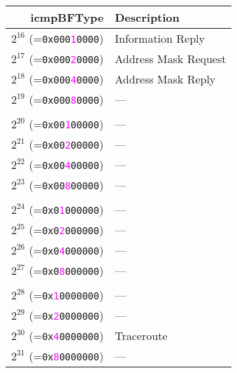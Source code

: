 \documentclass[documentation]{subfiles}
\begin{document}
\begin{minipage}{0.45\textwidth}
    \begin{longtable} {rl}
        \toprule
        {\bf icmpBFType} & {\bf Description} \\
        \midrule\endhead%
        $2^{16}$ (={\tt 0x000\textcolor{magenta}{1}0000}) & Information Reply \\
        $2^{17}$ (={\tt 0x000\textcolor{magenta}{2}0000}) & Address Mask Request \\
        $2^{18}$ (={\tt 0x000\textcolor{magenta}{4}0000}) & Address Mask Reply \\
        $2^{19}$ (={\tt 0x000\textcolor{magenta}{8}0000}) & --- \\
        \\
        $2^{20}$ (={\tt 0x00\textcolor{magenta}{1}00000}) & --- \\
        $2^{21}$ (={\tt 0x00\textcolor{magenta}{2}00000}) & --- \\
        $2^{22}$ (={\tt 0x00\textcolor{magenta}{4}00000}) & --- \\
        $2^{23}$ (={\tt 0x00\textcolor{magenta}{8}00000}) & --- \\
        \\
        $2^{24}$ (={\tt 0x0\textcolor{magenta}{1}000000}) & --- \\
        $2^{25}$ (={\tt 0x0\textcolor{magenta}{2}000000}) & --- \\
        $2^{26}$ (={\tt 0x0\textcolor{magenta}{4}000000}) & --- \\
        $2^{27}$ (={\tt 0x0\textcolor{magenta}{8}000000}) & --- \\
        \\
        $2^{28}$ (={\tt 0x\textcolor{magenta}{1}0000000}) & --- \\
        $2^{29}$ (={\tt 0x\textcolor{magenta}{2}0000000}) & --- \\
        $2^{30}$ (={\tt 0x\textcolor{magenta}{4}0000000}) & Traceroute \\
        $2^{31}$ (={\tt 0x\textcolor{magenta}{8}0000000}) & --- \\
        \bottomrule
    \end{longtable}
\end{minipage}
\end{document}
